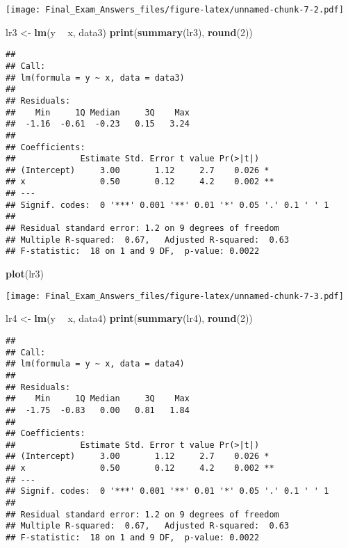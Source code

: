 \documentclass[]{article}
\newenvironment{Shaded}{\begin{snugshade}}{\end{snugshade}}
\newcommand{\KeywordTok}[1]{\textcolor[rgb]{0.13,0.29,0.53}{\textbf{#1}}}
\newcommand{\DecValTok}[1]{\textcolor[rgb]{0.00,0.00,0.81}{#1}}
\newcommand{\StringTok}[1]{\textcolor[rgb]{0.31,0.60,0.02}{#1}}
\newcommand{\OperatorTok}[1]{\textcolor[rgb]{0.81,0.36,0.00}{\textbf{#1}}}
\newcommand{\NormalTok}[1]{#1}
\begin{document}
\texttt{[image: Final\_Exam\_Answers\_files/figure-latex/unnamed-chunk-7-2.pdf]}

\begin{Shaded}
\begin{Highlighting}[]
\NormalTok{lr3 <-}\StringTok{ }\KeywordTok{lm}\NormalTok{(y }\OperatorTok{~}\StringTok{ }\NormalTok{x, data3)}
\KeywordTok{print}\NormalTok{(}\KeywordTok{summary}\NormalTok{(lr3), }\KeywordTok{round}\NormalTok{(}\DecValTok{2}\NormalTok{))}
\end{Highlighting}
\end{Shaded}

\begin{verbatim}
## 
## Call:
## lm(formula = y ~ x, data = data3)
## 
## Residuals:
##    Min     1Q Median     3Q    Max 
##  -1.16  -0.61  -0.23   0.15   3.24 
## 
## Coefficients:
##             Estimate Std. Error t value Pr(>|t|)   
## (Intercept)     3.00       1.12     2.7    0.026 * 
## x               0.50       0.12     4.2    0.002 **
## ---
## Signif. codes:  0 '***' 0.001 '**' 0.01 '*' 0.05 '.' 0.1 ' ' 1
## 
## Residual standard error: 1.2 on 9 degrees of freedom
## Multiple R-squared:  0.67,   Adjusted R-squared:  0.63 
## F-statistic:  18 on 1 and 9 DF,  p-value: 0.0022
\end{verbatim}

\begin{Shaded}
\begin{Highlighting}[]
\KeywordTok{plot}\NormalTok{(lr3)}
\end{Highlighting}
\end{Shaded}

\texttt{[image: Final\_Exam\_Answers\_files/figure-latex/unnamed-chunk-7-3.pdf]}

\begin{Shaded}
\begin{Highlighting}[]
\NormalTok{lr4 <-}\StringTok{ }\KeywordTok{lm}\NormalTok{(y }\OperatorTok{~}\StringTok{ }\NormalTok{x, data4)}
\KeywordTok{print}\NormalTok{(}\KeywordTok{summary}\NormalTok{(lr4), }\KeywordTok{round}\NormalTok{(}\DecValTok{2}\NormalTok{))}
\end{Highlighting}
\end{Shaded}

\begin{verbatim}
## 
## Call:
## lm(formula = y ~ x, data = data4)
## 
## Residuals:
##    Min     1Q Median     3Q    Max 
##  -1.75  -0.83   0.00   0.81   1.84 
## 
## Coefficients:
##             Estimate Std. Error t value Pr(>|t|)   
## (Intercept)     3.00       1.12     2.7    0.026 * 
## x               0.50       0.12     4.2    0.002 **
## ---
## Signif. codes:  0 '***' 0.001 '**' 0.01 '*' 0.05 '.' 0.1 ' ' 1
## 
## Residual standard error: 1.2 on 9 degrees of freedom
## Multiple R-squared:  0.67,   Adjusted R-squared:  0.63 
## F-statistic:  18 on 1 and 9 DF,  p-value: 0.0022
\end{verbatim}
\end{document}
